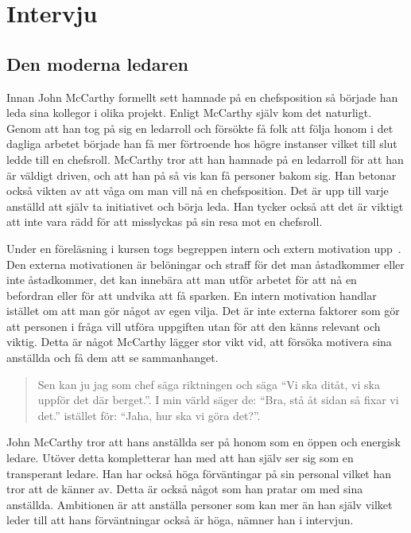 \section{Intervju}
\label{sec:intervju}


\subsection{Den moderna ledaren}
Innan John McCarthy formellt sett hamnade på en chefsposition så började han leda sina kollegor i olika projekt. Enligt McCarthy själv kom det naturligt. Genom att han tog på sig en ledarroll och försökte få folk att följa honom i det dagliga arbetet började han få mer förtroende hos högre instanser vilket till slut ledde till en chefsroll. McCarthy tror att han hamnade på en ledarroll för att han är väldigt driven, och att han på så vis kan få personer bakom sig. Han betonar också vikten av att våga om man vill nå en chefsposition. Det är upp till varje anställd att själv ta initiativet och börja leda. Han tycker också att det är viktigt att inte vara rädd för att misslyckas på sin resa mot en chefsroll.

Under en föreläsning i kursen togs begreppen intern och extern motivation upp~\citep{motivation}. Den externa motivationen är belöningar och straff för det man åstadkommer eller inte åstadkommer, det kan innebära att man utför arbetet för att nå en befordran eller för att undvika att få sparken. En intern motivation handlar istället om att man gör något av egen vilja. Det är inte externa faktorer som gör att personen i fråga vill utföra uppgiften utan för att den känns relevant och viktig. Detta är något McCarthy lägger stor vikt vid, att försöka motivera sina anställda och få dem att se sammanhanget.

\begin{quote}
 Sen kan ju jag som chef säga riktningen och säga ``Vi ska ditåt, vi ska uppför det där berget.''. I min värld säger de: ``Bra, stå åt sidan så fixar vi det.'' istället för: ``Jaha, hur ska vi göra det?''.
\end{quote}

John McCarthy tror att hans anställda ser på honom som en öppen och energisk ledare. Utöver detta kompletterar han med att han själv ser sig som en transperant ledare. Han har också höga förväntingar på sin personal vilket han tror att de känner av. Detta är också något som han pratar om med sina anställda. Ambitionen är att anställa personer som kan mer än han själv vilket leder till att hans förväntningar också är höga, nämner han i intervjun.

